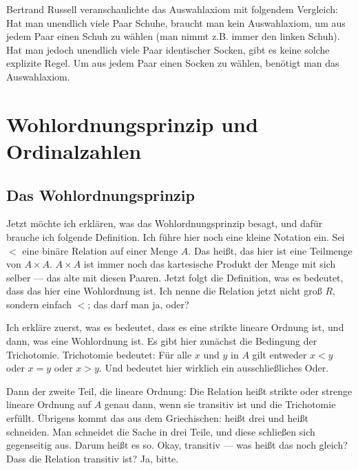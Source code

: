 \begin{didactic-insight}
Bertrand Russell veranschaulichte das Auswahlaxiom mit folgendem Vergleich:
Hat man unendlich viele Paar Schuhe, braucht man kein Auswahlaxiom, um aus jedem Paar einen Schuh zu wählen (man nimmt z.B. immer den linken Schuh). Hat man jedoch unendlich viele Paar identischer Socken, gibt es keine solche explizite Regel. Um aus jedem Paar einen Socken zu wählen, benötigt man das Auswahlaxiom.
\end{didactic-insight}

\section{Wohlordnungsprinzip und Ordinalzahlen}

\subsection{Das Wohlordnungsprinzip}

\begin{spoken-clean}[00:22:30 - 00:25:00]
Jetzt möchte ich erklären, was das Wohlordnungsprinzip besagt, und dafür brauche ich folgende Definition. Ich führe hier noch eine kleine Notation ein. Sei $<$ eine binäre Relation auf einer Menge $A$. Das heißt, das hier ist eine Teilmenge von $A \times A$. $A \times A$ ist immer noch das kartesische Produkt der Menge mit sich selber --- das alte mit diesen Paaren. Jetzt folgt die Definition, was es bedeutet, dass das hier eine Wohlordnung ist. Ich nenne die Relation jetzt nicht groß $R$, sondern einfach $<$; das darf man ja, oder?

Ich erkläre zuerst, was es bedeutet, dass es eine strikte lineare Ordnung ist, und dann, was eine Wohlordnung ist. Es gibt hier zunächst die Bedingung der Trichotomie. Trichotomie bedeutet: Für alle $x$ und $y$ in $A$ gilt entweder $x < y$ oder $x = y$ oder $x > y$. Und  bedeutet hier wirklich ein ausschließliches Oder. 

Dann der zweite Teil, die lineare Ordnung: Die Relation heißt strikte oder strenge lineare Ordnung auf $A$ genau dann, wenn sie transitiv ist und die Trichotomie erfüllt. Übrigens kommt das aus dem Griechischen:  heißt drei und  heißt schneiden. Man schneidet die Sache in drei Teile, und diese schließen sich gegenseitig aus. Darum heißt es so. Okay, transitiv --- was heißt das noch gleich? Dass die Relation transitiv ist? Ja, bitte.
\end{spoken-clean}

